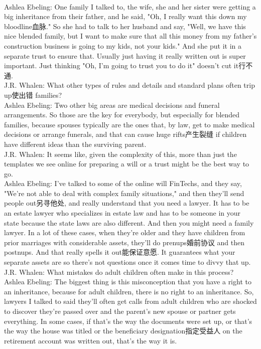 \documentclass[a4paper,12pt]{article}
\begin{document}
\\Ashlea Ebeling: One family I talked to, the wife, she and her sister were getting a big inheritance from their father, and he said, "Oh, I really want this down my bloodline血脉." So she had to talk to her husband and say, "Well, we have this nice blended family, but I want to make sure that all this money from my father's construction business is going to my kids, not your kids." And she put it in a separate trust to ensure that. Usually just having it really written out is super important. Just thinking "Oh, I'm going to trust you to do it" doesn't cut it行不通.
\\J.R. Whalen: What other types of rules and details and standard plans often trip up使出错 families?
\\Ashlea Ebeling: Two other big areas are medical decisions and funeral arrangements. So those are the key for everybody, but especially for blended families, because spouses typically are the ones that, by law, get to make medical decisions or arrange funerals, and that can cause huge rifts产生裂缝 if children have different ideas than the surviving parent.
\\J.R. Whalen: It seems like, given the complexity of this, more than just the templates we see online for preparing a will or a trust might be the best way to go.
\\Ashlea Ebeling: I've talked to some of the online will FinTechs, and they say, "We're not able to deal with complex family situations," and then they'll send people out另寻他处, and really understand that you need a lawyer. It has to be an estate lawyer who specializes in estate law and has to be someone in your state because the state laws are also different. And then you might need a family lawyer. In a lot of these cases, when they're older and they have children from prior marriages with considerable assets, they'll do prenups婚前协议 and then postnups. And that really spells it out能保证意愿. It guarantees what your separate assets are so there's not questions once it comes time to divvy that up.
\\J.R. Whalen: What mistakes do adult children often make in this process?
\\Ashlea Ebeling: The biggest thing is this misconception that you have a right to an inheritance, because for adult children, there is no right to an inheritance. So, lawyers I talked to said they'll often get calls from adult children who are shocked to discover they're passed over and the parent's new spouse or partner gets everything. In some cases, if that's the way the documents were set up, or that's the way the house was titled or the beneficiary designation指定受益人 on the retirement account was written out, that's the way it is.
\end{document}
